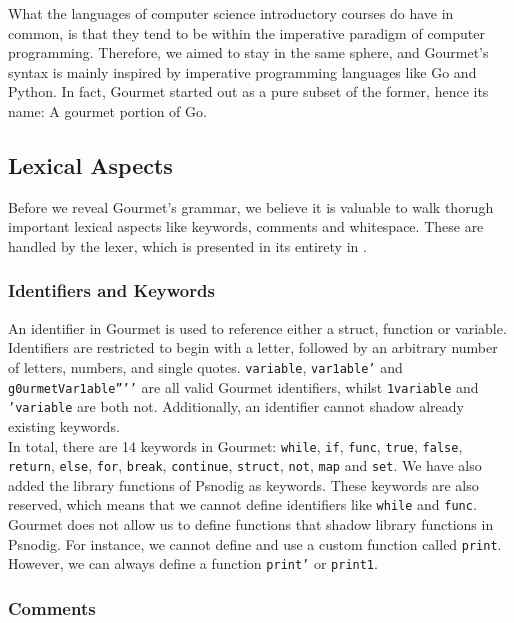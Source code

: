 What the languages of computer science introductory courses do have in common, is that they tend to be within the imperative paradigm of computer programming. Therefore, we aimed to stay in the same sphere, and Gourmet's syntax is mainly inspired by imperative programming languages like Go and Python. In fact, Gourmet started out as a pure subset of the former, hence its name: A gourmet portion of Go.

\subsection{Lexical Aspects}

Before we reveal Gourmet's grammar, we believe it is valuable to walk thorugh important lexical aspects like keywords, comments and whitespace. These are handled by the lexer, which is presented in its entirety in .

\subsubsection{Identifiers and Keywords}

An identifier in Gourmet is used to reference either a struct, function or variable. Identifiers are restricted to begin with a letter, followed by an arbitrary number of letters, numbers, and single quotes. \texttt{variable}, \texttt{var1able’} and \texttt{g0urmetVar1able''’'} are all valid Gourmet identifiers, whilst \texttt{1variable} and \texttt{'variable} are both not. Additionally, an identifier cannot shadow already existing keywords. \\

In total, there are 14 keywords in Gourmet: \texttt{while}, \texttt{if}, \texttt{func}, \texttt{true}, \texttt{false}, \texttt{return}, \texttt{else}, \texttt{for}, \texttt{break}, \texttt{continue}, \texttt{struct}, \texttt{not}, \texttt{map} and \texttt{set}. We have also added the library functions of Psnodig as keywords. These keywords are also reserved, which means that we cannot define identifiers like \texttt{while} and \texttt{func}. \\

Gourmet does not allow us to define functions that shadow library functions in Psnodig. For instance, we cannot define and use a custom function called \texttt{print}. However, we can always define a function \texttt{print’} or \texttt{print1}.

\subsubsection{Comments}

